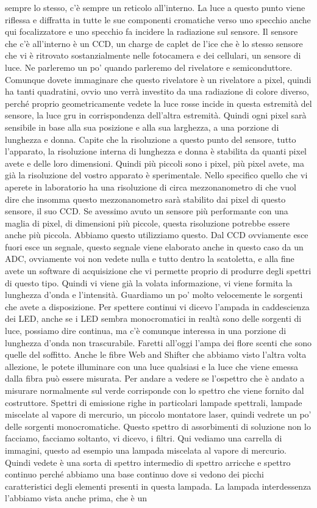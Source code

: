 sempre lo stesso, c'è sempre un reticolo all'interno. La luce a questo punto viene riflessa e diffratta in tutte le sue componenti cromatiche verso uno specchio anche qui focalizzatore e uno specchio fa incidere la radiazione sul sensore. Il sensore che c'è all'interno è un CCD, un charge de caplet de l'ice che è lo stesso sensore che vi è ritrovato sostanzialmente nelle fotocamera e dei cellulari, un sensore di luce. Ne parleremo un po' quando parleremo del rivelatore e semiconduttore. Comunque dovete immaginare che questo rivelatore è un rivelatore a pixel, quindi ha tanti quadratini, ovvio uno verrà investito da una radiazione di colore diverso, perché proprio geometricamente vedete la luce rosse incide in questa estremità del sensore, la luce gru in corrispondenza dell'altra estremità. Quindi ogni pixel sarà sensibile in base alla sua posizione e alla sua larghezza, a una porzione di lunghezza e donna. Capite che la risoluzione a questo punto del sensore, tutto l'apparato, la risoluzione interna di lunghezza e donna è stabilita da quanti pixel avete e delle loro dimensioni. Quindi più piccoli sono i pixel, più pixel avete, ma già la risoluzione del vostro apparato è sperimentale. Nello specifico quello che vi aperete in laboratorio ha una risoluzione di circa mezzonanometro di che vuol dire che insomma questo mezzonanometro sarà stabilito dai pixel di questo sensore, il suo CCD. Se avessimo avuto un sensore più performante con una maglia di pixel, di dimensioni più piccole, questa risoluzione potrebbe essere anche più piccola. Abbiamo questo utilizziamo questo. Dal CCD ovviamente esce fuori esce un segnale, questo segnale viene elaborato anche in questo caso da un ADC, ovviamente voi non vedete nulla e tutto dentro la scatoletta, e alla fine avete un software di acquisizione che vi permette proprio di produrre degli spettri di questo tipo. Quindi vi viene già la volata informazione, vi viene formita la lunghezza d'onda e l'intensità. Guardiamo un po' molto velocemente le sorgenti che avete a disposizione. Per spettere continui vi dicevo l'ampada in caddescienza dei LED, anche se i LED sembra monocromatici in realtà sono delle sorgenti di luce, possiamo dire continua, ma c'è comunque interessa in una porzione di lunghezza d'onda non trascurabile. Faretti all'oggi l'ampa dei flore scenti che sono quelle del soffitto. Anche le fibre Web and Shifter che abbiamo visto l'altra volta allezione, le potete illuminare con una luce qualsiasi e la luce che viene emessa dalla fibra può essere misurata. Per andare a vedere se l'ospettro che è andato a misurare normalmente sul verde corrisponde con lo spettro che viene fornito dal costruttore. Spettri di emissione righe in particolari lampade spettrali, lampade miscelate al vapore di mercurio, un piccolo montatore laser, quindi vedrete un po' delle sorgenti monocromatiche. Questo spettro di assorbimenti di soluzione non lo facciamo, facciamo soltanto, vi dicevo, i filtri. Qui vediamo una carrella di immagini, questo ad esempio una lampada miscelata al vapore di mercurio. Quindi vedete è una sorta di spettro intermedio di spettro arricche e spettro continuo perché abbiamo una base continuo dove si vedono dei picchi caratteristici degli elementi presenti in questa lampada. La lampada interdessenza l'abbiamo vista anche prima, che è un 